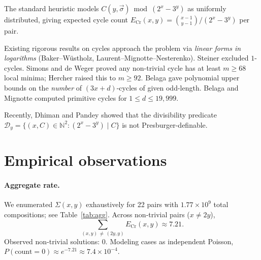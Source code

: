 \documentclass[11pt,a4paper]{article}
\theoremstyle{plain}
\theoremstyle{definition}
\begin{document}
The standard heuristic \cite{crandall1978} models $C(y, \vec\sigma) \bmod (2^x - 3^y)$ as uniformly distributed, giving expected cycle count $E_{\mathrm{Cr}}(x, y) = \binom{x-1}{y-1} / (2^x - 3^y)$ per pair.

Existing rigorous results on cycles approach the problem via \emph{linear forms in logarithms} (Baker--W\"ustholz, Laurent--Mignotte--Nesterenko). Steiner \cite{steiner1977} excluded $1$-cycles. Simons and de Weger \cite{sdw2005} proved any non-trivial cycle has at least $m \ge 68$ local minima; Hercher \cite{hercher2022} raised this to $m \ge 92$. Belaga \cite{belaga2003} gave polynomial upper bounds on the \emph{number} of $(3x+d)$-cycles of given odd-length. Belaga and Mignotte \cite{belaga2006} computed primitive cycles for $1 \le d \le 19{,}999$.

Recently, Dhiman and Pandey \cite{dhiman2026} showed that the divisibility predicate $\mathcal{D}_y = \{(x, C) \in \mathbb{N}^2 : (2^x - 3^y) \mid C\}$ is not Presburger-definable.

\section{Empirical observations}

\paragraph{Aggregate rate.} We enumerated $\Sigma(x, y)$ exhaustively for 22 pairs with $1.77 \times 10^9$ total compositions; see Table~\ref{tab:agg}. Across non-trivial pairs ($x \ne 2y$),
\[
\sum_{(x,y)\,\ne\, (2y,y)} E_{\mathrm{Cr}}(x, y) \approx 7.21.
\]
Observed non-trivial solutions: $0$. Modeling cases as independent Poisson, $P(\text{count}=0) \approx e^{-7.21} \approx 7.4 \times 10^{-4}$.
\end{document}
